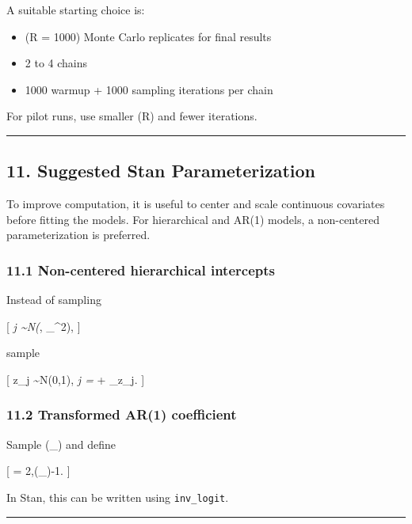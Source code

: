 \documentclass[
  letterpaper,
  DIV=11,
  numbers=noendperiod]{scrartcl}
\providecommand{\tightlist}{%
  \setlength{\itemsep}{0pt}\setlength{\parskip}{0pt}}
\begin{document}
A suitable starting choice is:

\begin{itemize}
\tightlist
\item
  (R = 1000) Monte Carlo replicates for final results
\item
  2 to 4 chains
\item
  1000 warmup + 1000 sampling iterations per chain
\end{itemize}

For pilot runs, use smaller (R) and fewer iterations.

\begin{center}\rule{0.5\linewidth}{0.5pt}\end{center}

\subsection{11. Suggested Stan
Parameterization}\label{suggested-stan-parameterization}

To improve computation, it is useful to center and scale continuous
covariates before fitting the models. For hierarchical and AR(1) models,
a non-centered parameterization is preferred.

\subsubsection{11.1 Non-centered hierarchical
intercepts}\label{non-centered-hierarchical-intercepts}

Instead of sampling

{[} \alpha\emph{j \sim N(\mu}\alpha, \tau\_\alpha\^{}2), {]}

sample

{[} z\_j \sim N(0,1), \qquad \alpha\emph{j = \mu}\alpha +
\tau\_\alpha z\_j. {]}

\subsubsection{11.2 Transformed AR(1)
coefficient}\label{transformed-ar1-coefficient}

Sample (\eta\_\phi \in {}) and define

{[} \phi = 2,(\eta\_\phi)-1. {]}

In Stan, this can be written using \texttt{inv\_logit}.

\begin{center}\rule{0.5\linewidth}{0.5pt}\end{center}
\end{document}
